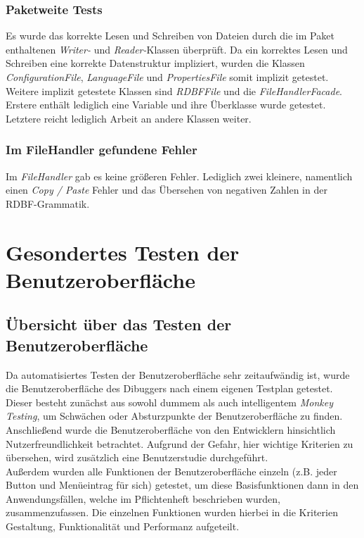 \documentclass[parskip=full]{scrartcl}
\begin{document}
\subsubsection{Paketweite Tests}
Es wurde das korrekte Lesen und Schreiben von Dateien durch die im Paket enthaltenen \textit{Writer-} und \textit{Reader-}Klassen überprüft.
Da ein korrektes Lesen und Schreiben eine korrekte Datenstruktur impliziert, wurden die Klassen \textit{ConfigurationFile}, \textit{LanguageFile} und \textit{PropertiesFile} somit implizit getestet. Weitere implizit getestete Klassen sind \textit{RDBFFile} und die \textit{FileHandlerFacade}. Erstere enthält lediglich eine Variable und ihre Überklasse wurde getestet. Letztere reicht lediglich Arbeit an andere Klassen weiter.

\subsubsection{Im FileHandler gefundene Fehler}
Im \textit{FileHandler} gab es keine größeren Fehler. Lediglich zwei kleinere, namentlich einen \textit{Copy / Paste} Fehler und das Übersehen von negativen Zahlen in der RDBF-Grammatik.

\newpage
\section{Gesondertes Testen der Benutzeroberfläche}\label{gui}

\subsection{Übersicht über das Testen der Benutzeroberfläche}
Da automatisiertes Testen der Benutzeroberfläche sehr zeitaufwändig ist, wurde die Benutzeroberfläche des Dibuggers nach einem eigenen Testplan getestet. Dieser besteht zunächst aus sowohl dummem als auch intelligentem \textit{Monkey Testing}, um Schwächen oder Absturzpunkte der Benutzeroberfläche zu finden. \\
Anschließend wurde die Benutzeroberfläche von den Entwicklern hinsichtlich Nutzerfreundlichkeit betrachtet. Aufgrund der Gefahr, hier wichtige Kriterien zu übersehen, wird zusätzlich eine Benutzerstudie durchgeführt. \\
Außerdem wurden alle Funktionen der Benutzeroberfläche einzeln (z.B. jeder Button und Menüeintrag für sich) getestet, um diese Basisfunktionen dann in den Anwendungsfällen, welche im Pflichtenheft beschrieben wurden, zusammenzufassen. Die einzelnen Funktionen wurden hierbei in die Kriterien Gestaltung, Funktionalität und Performanz aufgeteilt.
\end{document}
